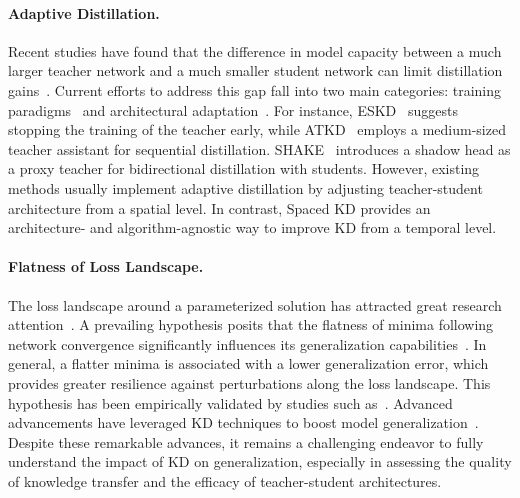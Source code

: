 \paragraph{Adaptive Distillation.}\label{adaptiveKD}
Recent studies have found that the difference in model capacity between a much larger teacher network and a much smaller student network can limit distillation gains~\citep{KnowledgeGap_2020_CVPR,earlystop,liu2020search}. Current efforts to address this gap fall into two main categories: training paradigms~\citep{gao2018embarrassingly} and architectural adaptation~\citep{kang2020towards,gu2020search}. For instance, ESKD~\citep{earlystop} suggests stopping the training of the teacher early, while ATKD~\citep{mirzadeh2020improved} employs a medium-sized teacher assistant for sequential distillation. SHAKE~\citep{li2022shadow} introduces a shadow head as a proxy teacher for bidirectional distillation with students. However, existing methods usually implement adaptive distillation by adjusting teacher-student architecture from a spatial level. In contrast, Spaced KD provides an architecture- and algorithm-agnostic way to improve KD from a temporal level.


\vspace{-.5em}
\paragraph{Flatness of Loss Landscape.}
The loss landscape around a parameterized solution has attracted great research attention~\citep{keskar2016large,hochreiter1994simplifying,izmailov2018averaging,dinh2017sharp,he2019asymmetric}. A prevailing hypothesis posits that the flatness of minima following network convergence significantly influences its generalization capabilities~\citep{keskar2016large}. In general, a flatter minima is associated with a lower generalization error, which provides greater resilience against perturbations along the loss landscape. This hypothesis has been empirically validated by studies such as~\cite{he2019asymmetric}. Advanced advancements have leveraged KD techniques to boost model generalization~\citep{deepMutual,zhao2023dot,self-kd}. Despite these remarkable advances, it remains a challenging endeavor to fully understand the impact of KD on generalization, especially in assessing the quality of knowledge transfer and the efficacy of teacher-student architectures.

